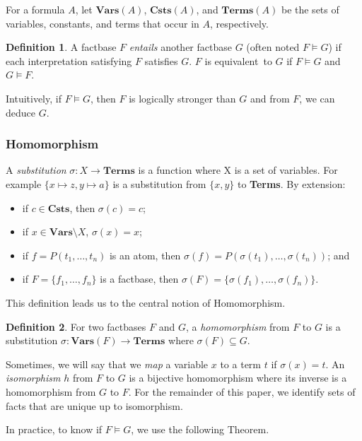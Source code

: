 \documentclass{article}
\theoremstyle{definition}
\newtheorem{definition}{Definition}[section]
\theoremstyle{remark}
\newcommand{\Vars}{\textbf{Vars}}
\newcommand{\Terms}{\textbf{Terms}}
\newcommand{\Csts}{\textbf{Csts}}
\begin{document}
For a formula $A$, let \emph{$\Vars(A)$}, \emph{$\Csts(A)$}, and \emph{$\Terms(A)$} be the sets of variables, constants, and terms that occur in $A$, respectively.

\begin{definition}
A factbase $F$ \emph{entails} another factbase $G$ (often noted $F \models G$) if each interpretation satisfying $F$ satisfies $G$. $F$ is equivalent\ to $G$ if $F \models G$ and $G \models F$.
\end{definition}

Intuitively, if $F \models G$, then $F$ is logically stronger than $G$ and from $F$, we can deduce $G$.

\subsubsection{Homomorphism}

A \emph{substitution} $\sigma:X \to \Terms$ is a function where X is a set of variables. For example $\{x \mapsto z, y \mapsto a \}$ is a substitution from $\{x,y\}$ to \Terms. By extension: 
\begin{itemize}
\item if $c \in \Csts$, then $\sigma(c) = c$;
\item if $x \in \Vars \setminus X$, $\sigma(x) = x$;
\item if $f = P(t_1,\ldots,t_n)$ is an atom, then $\sigma(f) = P(\sigma(t_1),\ldots,\sigma(t_n))$; and
\item if $F = \{f_1,\ldots,f_n\}$ is a factbase, then $\sigma(F) = \{\sigma(f_1),\ldots,\sigma(f_n)\}$.
\end{itemize}

This definition leads us to the central notion of Homomorphism.

\begin{definition}
For two factbases $F$ and $G$, a \emph{homomorphism} from $F$ to $G$ is a substitution $\sigma:\Vars(F) \to \Terms$ where $\sigma(F) \subseteq G$. 
\end{definition}

Sometimes, we will say that we \emph{map} a variable $x$ to a term $t$ if $\sigma(x)=t$. An \emph{isomorphism} $h$ from $F$ to $G$ is a bijective homomorphism where its inverse is a homomorphism from $G$ to $F$. For the remainder of this paper, we identify sets of facts that are unique up to isomorphism. 

In practice, to know if $F \models G$, we use the following Theorem.
\end{document}
